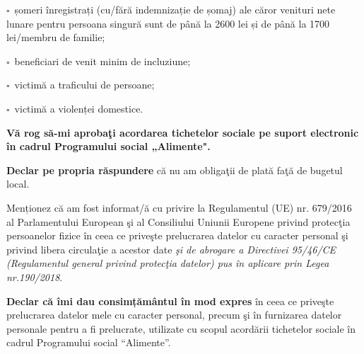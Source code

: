 \documentclass[11pt,a4paper]{article}
\newcommand{\checkboxempty}{$\square$}
\begin{document}
\vspace{0.2cm}

\hspace{0.5cm}\checkboxempty\ șomeri înregistrați (cu/fără indemnizație de șomaj) ale căror venituri nete lunare pentru persoana singură sunt de până la 2600 lei și de până la 1700 lei/membru de familie;

\vspace{0.2cm}

\hspace{0.5cm}\checkboxempty\ beneficiari de venit minim de incluziune;

\vspace{0.2cm}

\hspace{0.5cm}\checkboxempty\ victimă a traficului de persoane;

\vspace{0.2cm}

\hspace{0.5cm}\checkboxempty\ victimă a violenței domestice.

\vspace{0.25cm}

\hspace{1cm}\textbf{Vă rog să-mi aprobaţi acordarea tichetelor sociale pe suport electronic în cadrul Programului social „Alimente".}

\vspace{0.3cm}

\hspace{1cm}\textbf{Declar pe propria răspundere} că nu am obligaţii de plată faţă de bugetul local.

\vspace{0.3cm}

\hspace{1cm}Menționez că am fost informat/ă cu privire la Regulamentul (UE) nr. 679/2016 al Parlamentului European şi al Consiliului Uniunii Europene privind protecţia persoanelor fizice în ceea ce priveşte prelucrarea datelor cu caracter personal şi privind libera circulaţie a acestor date \textit{şi de abrogare a Directivei 95/46/CE (Regulamentul general privind protecţia datelor) pus în aplicare prin Legea nr.190/2018}.

\vspace{0.3cm}

\hspace{1cm}\textbf{Declar că îmi dau consimțământul în mod expres} în ceea ce priveşte prelucrarea datelor mele cu caracter personal, precum şi în furnizarea datelor personale pentru a fi prelucrate, utilizate cu scopul acordării tichetelor sociale în cadrul Programului social ``Alimente''.
\end{document}

